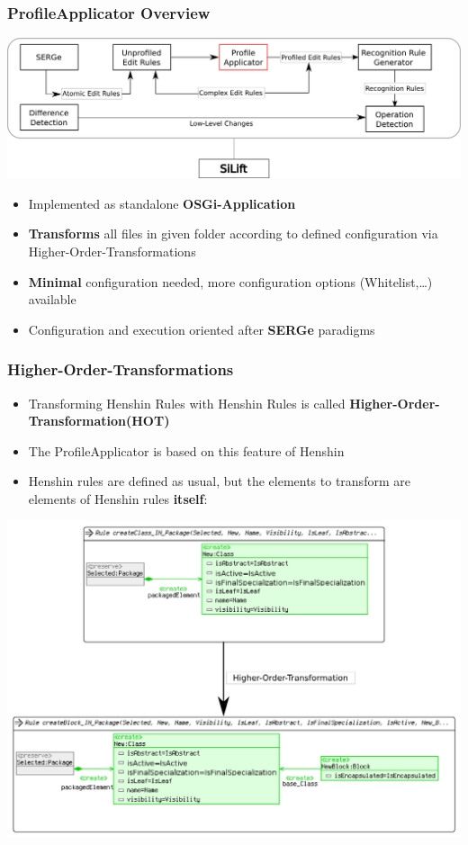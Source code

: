 \documentclass[10pt]{beamer}
\begin{document}
\begin{frame}
\frametitle{ProfileApplicator Overview}
\begin{center}
\includegraphics[scale=0.4]{profileapplicator}\\
\end{center}
\begin{itemize}
  \item Implemented as standalone \textbf{OSGi-Application}
  \item \textbf{Transforms} all files in given folder according to defined
  configuration via Higher-Order-Transformations
  \item \textbf{Minimal} configuration needed, more configuration options
  (Whitelist,\ldots) available
    \item Configuration and execution oriented after \textbf{SERGe} paradigms
\end{itemize}
\end{frame}
\begin{frame}
\frametitle{Higher-Order-Transformations}
\begin{itemize}
  \item Transforming Henshin Rules with Henshin Rules is called
  \textbf{Higher-Order-Transformation(HOT)}
  \item The ProfileApplicator is based on this feature of Henshin
  \item Henshin rules are defined as usual, but the elements to transform are
  elements of Henshin rules \textbf{itself}:
\end{itemize}
\begin{center}
\includegraphics[scale=0.3]{hot_example}\\
\end{center}
\end{frame}
\end{document}
